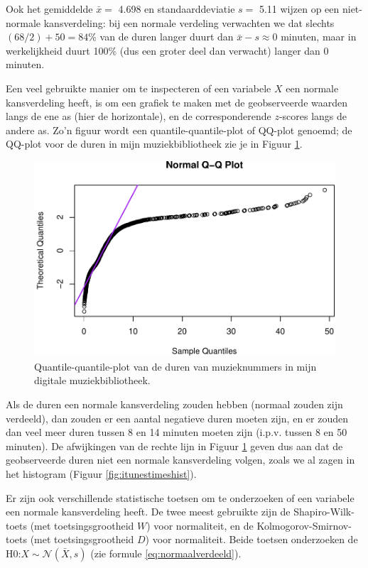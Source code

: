 \documentclass[
]{book}
\begin{document}
Ook het gemiddelde \(\bar{x} =\) 4.698 en
standaarddeviatie \(s =\) 5.11
wijzen op een niet-normale kansverdeling:
bij een normale verdeling verwachten we dat slechts \((68/2)+50=84\)\% van de duren langer duurt dan
\(\bar{x}-s\approx 0\) minuten, maar in werkelijkheid duurt 100\%
(dus een groter deel dan verwacht) langer dan 0 minuten.

Een veel gebruikte manier om te inspecteren of een variabele \(X\) een
normale kansverdeling heeft, is om een grafiek te maken met de
geobserveerde waarden langs de ene as (hier de horizontale), en de corresponderende \(z\)-scores
langs de andere as. Zo'n figuur wordt een quantile-quantile-plot of
QQ-plot genoemd; de QQ-plot voor de duren in mijn muziekbibliotheek zie
je in Figuur \ref{fig:itunestimesqqplot}.

\begin{figure}
\centering
\includegraphics{KMS-NL_files/figure-latex/itunestimesqqplot-1.pdf}
\caption{\label{fig:itunestimesqqplot}Quantile-quantile-plot van de duren van muzieknummers in mijn digitale muziekbibliotheek.}
\end{figure}

Als de duren een normale kansverdeling zouden hebben (normaal zouden
zijn verdeeld), dan zouden er een aantal negatieve duren moeten zijn, en
er zouden dan veel meer duren tussen 8 en 14 minuten moeten zijn (i.p.v.
tussen 8 en 50 minuten). De afwijkingen van de rechte lijn in
Figuur \ref{fig:itunestimesqqplot} geven dus aan dat de geobserveerde
duren niet een normale kansverdeling volgen, zoals we al zagen in het
histogram (Figuur \ref{fig:itunestimeshist}).

Er zijn ook verschillende statistische toetsen om te onderzoeken of een
variabele een normale kansverdeling heeft. De twee meest gebruikte zijn
de Shapiro-Wilk-toets (met toetsingsgrootheid \(W\)) voor normaliteit, en
de Kolmogorov-Smirnov-toets (met toetsingsgrootheid \(D\)) voor
normaliteit. Beide toetsen onderzoeken de
H0:\(X\sim\mathcal{N}(\bar{X},s)\) (zie
formule \eqref{eq:normaalverdeeld}).
\end{document}
